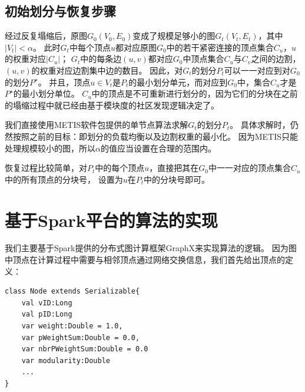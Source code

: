\documentclass[master]{njuthesis}
\begin{document}
\subsection{初始划分与恢复步骤}
经过反复塌缩后，原图$G_0(V_0,E_0)$变成了规模足够小的图$G_t(V_t,E_t)$，其中$|V_t| < \alpha$。
此时$G_t$中每个顶点$u$都对应原图$G_0$中的若干紧密连接的顶点集合$C_u$，$u$的权重对应$|C_u|$；
$G_t$中的每条边$(u,v)$都对应$G_0$中顶点集合$C_u$与$C_v$之间的边割，$(u,v)$的权重对应边割集中边的数目。
因此，对$G_t$的划分$P_t$可以一一对应到对$G_0$的划分$P^\star$。
并且，顶点$u \in V_t$是$P_t$的最小划分单元，而对应到$G_0$中，集合$C_u$才是$P^\star$的最小划分单位。
$C_u$中的顶点是不可重新进行划分的，因为它们的分块在之前的塌缩过程中就已经由基于模块度的社区发现逻辑决定了。

我们直接使用METIS软件包提供的单节点算法求解$G_t$的划分$P_t$。
具体求解时，仍然按照之前的目标：即划分的负载均衡以及边割权重的最小化。
因为METIS只能处理规模较小的图，所以$\alpha$的值应当设置在合理的范围内。

恢复过程比较简单，对$P_t$中的每个顶点$u$，直接把其在$G_0$中一一对应的顶点集合$C_u$中的所有顶点的分块号，
设置为$u$在$P_t$中的分块号即可。

\section{基于Spark平台的算法的实现}
我们主要基于Spark提供的分布式图计算框架GraphX来实现算法的逻辑。
因为图中顶点在计算过程中需要与相邻顶点通过网络交换信息，我们首先给出顶点的定义：
\begin{lstlisting}
class Node extends Serializable{
    val vID:Long
    val pID:Long
    var weight:Double = 1.0,
    var pWeightSum:Double = 0.0,
    var nbrPWeightSum:Double = 0.0
    var modularity:Double
    ...
}
\end{lstlisting}
\end{document}
